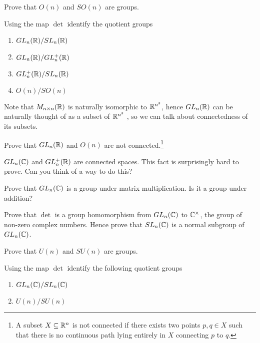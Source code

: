 \begin{question}
  Prove that $O(n)$ and $SO(n)$ are groups.
\end{question}

\begin{question}
	Using the map $\det$ identify the quotient groups
	\begin{enumerate}
		\item $GL_n(\mathbb{R})/SL_n(\mathbb{R})$
		\item $GL_n(\mathbb{R})/GL^+_n(\mathbb{R})$
		\item $GL^+_n(\mathbb{R})/SL_n(\mathbb{R})$
		\item $O(n)/SO(n)$
	\end{enumerate}
\end{question}

Note that $M_{n \times n}(\mathbb{R})$ is naturally isomorphic to $\mathbb{R}^{n^2}$, hence $GL_n(\mathbb{R})$ can be naturally thought of as a subset of $\mathbb{R}^{n^2}$ , so we can talk about connectedness of its subsets.
\begin{question}
	Prove that $GL_n(\mathbb{R})$ and $O(n)$ are not connected.\footnote{A subset $X \subseteq \mathbb{R}^n$ is not connected if there exists two points $p,q \in X$ such that there is no continuous path lying entirely in $X$ connecting $p$ to $q$.}
\end{question}
\begin{remark}
	$GL_n(\mathbb{C})$ and $GL^+_n(\mathbb{R})$ are connected spaces. This fact is surprisingly hard to prove. Can you think of a way to do this?
\end{remark}

\begin{question}
	Prove that $GL_n(\mathbb{C})$ is a group under matrix multiplication. Is it a group under addition?
\end{question}

\begin{question}
	Prove that $\det$ is a group homomorphism from $GL_n(\mathbb{C})$ to $\mathbb{C}^\times$, the group of non-zero complex numbers. Hence prove that $SL_n(\mathbb{C})$ is a normal subgroup of $GL_n(\mathbb{C})$.
\end{question}

\begin{question}
  Prove that $U(n)$ and $SU(n)$ are groups.
\end{question}

\begin{question}
	Using the map $\det$ identify the following quotient groups
	\begin{enumerate}
		\item $GL_n(\mathbb{C})/SL_n(\mathbb{C})$
		\item $U(n)/SU(n)$
	\end{enumerate}
\end{question}

